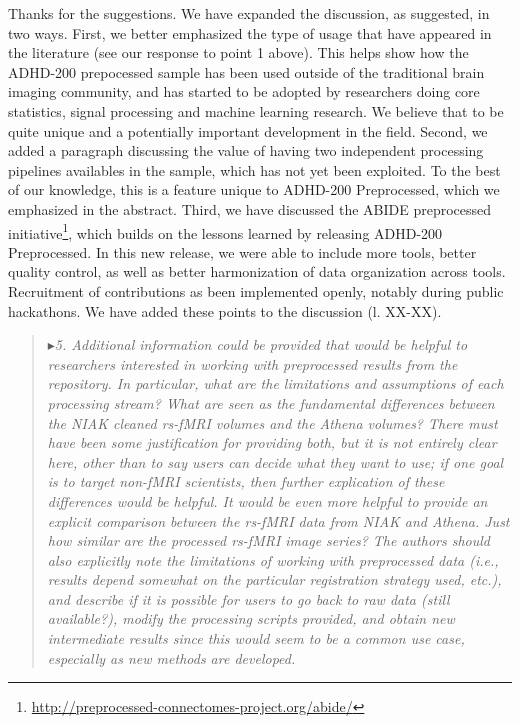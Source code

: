 \documentclass[authoryear,3p]{elsarticle}
\begin{document}
Thanks for the suggestions. We have expanded the discussion, as suggested, in two ways. First, we better emphasized the type of usage that have appeared in the literature (see our response to point 1 above). This helps show how the ADHD-200 prepocessed sample has been used outside of the traditional brain imaging community, and has started to be adopted by researchers doing core statistics, signal processing and machine learning research. We believe that to be quite unique and a potentially important development in the field. Second, we added a paragraph discussing the value of having two independent processing pipelines availables in the sample, which has not yet been exploited. To the best of our knowledge, this is a feature unique to ADHD-200 Preprocessed, which we emphasized in the abstract. Third, we have discussed the ABIDE preprocessed initiative\footnote{\url{http://preprocessed-connectomes-project.org/abide/}}, which builds on the lessons learned by releasing ADHD-200 Preprocessed. In this new release, we were able to include more tools, better quality control, as well as better harmonization of data organization across tools. Recruitment of contributions as been implemented openly, notably during public hackathons. We have added these points to the discussion (l. XX-XX).   

\begin{quote}
$\blacktriangleright$\emph{5. Additional information could be provided that would be helpful to researchers interested in working with preprocessed results from the repository. In particular, what are the limitations and assumptions of each processing stream?  What are seen as the fundamental differences between the NIAK cleaned rs-fMRI volumes and the Athena volumes? There must have been some justification for providing both, but it is not entirely clear here, other than to say users can decide what they want to use; if one goal is to target non-fMRI scientists, then further explication of these differences would be helpful. It would be even more helpful to provide an explicit comparison between the rs-fMRI data from NIAK and Athena.  Just how similar are the processed rs-fMRI image series?  The authors should also explicitly note the limitations of working with preprocessed data (i.e., results depend somewhat on the particular registration strategy used, etc.), and describe if it is possible for users
to go back to raw data (still available?), modify the processing scripts provided, and obtain new intermediate results since this would seem to be a common use case, especially as new methods are developed.
}
\end{quote}
\end{document}
